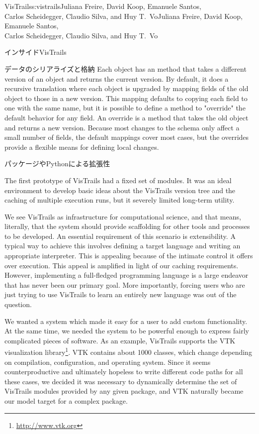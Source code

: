 \begin{aosachaptertoc}{VisTrails}{s:vistrails}{Juliana Freire, David Koop, Emanuele Santos, \\ Carlos Scheidegger, Claudio Silva, and Huy T.\ Vo}{Juliana Freire, David Koop, Emanuele Santos, \\ \hspace*{0.9cm} Carlos Scheidegger, Claudio Silva, and Huy T.\ Vo}
\begin{aosasect1}{インサイドVisTrails}
\begin{aosasect2}{データのシリアライズと格納}
Each object has an  method that takes a different
version of an object and returns the current version.  By default, it
does a recursive translation where each object is upgraded by mapping
fields of the old object to those in a new version.  This mapping
defaults to copying each field to one with the same name, but it is
possible to define a method to "override" the default behavior for any
field.  An override is a method that takes the old object and returns
a new version.  Because most changes to the schema only affect a small
number of fields, the default mappings cover most cases, but the
overrides provide a flexible means for defining local changes.

\end{aosasect2}

\begin{aosasect2}{パッケージやPythonによる拡張性}
\label{sec.vistrails.packages}

The first prototype of VisTrails had a fixed set of modules. It was an
ideal environment to develop basic ideas about the VisTrails version
tree and the caching of multiple execution runs, but it severely
limited long-term utility.

We see VisTrails as infrastructure for computational science, and that
means, literally, that the system should provide scaffolding for other
tools and processes to be developed. An essential requirement of this
scenario is extensibility.  A typical way to achieve this involves
defining a target language and writing an appropriate
interpreter. This is appealing because of the intimate control it
offers over execution. This appeal is amplified in light of our
caching requirements.  However, implementing a full-fledged
programming language is a large endeavor that has never been our
primary goal. More importantly, forcing users who are just trying to
use VisTrails to learn an entirely new language was out of the
question.

We wanted a system which made it easy for a user to add custom
functionality. At the same time, we needed the system to be powerful
enough to express fairly complicated pieces of software. As an
example, VisTrails supports the VTK visualization library\footnote{\url{http://www.vtk.org}}. VTK
contains about 1000 classes, which change depending on compilation,
configuration, and operating system. Since it seems counterproductive
and ultimately hopeless to write different code paths for all these
cases, we decided it was necessary to dynamically determine the set of
VisTrails modules provided by any given package, and VTK naturally
became our model target for a complex package.


\end{aosasect2}
\end{aosasect1}
\end{aosachaptertoc}
